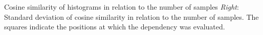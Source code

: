 \label{fig:cosine}
Cosine similarity of histograms in relation to the number of
samples \emph{Right}: Standard deviation of cosine similarity in
relation to the number of samples. The squares indicate the
positions at which the dependency was evaluated.%